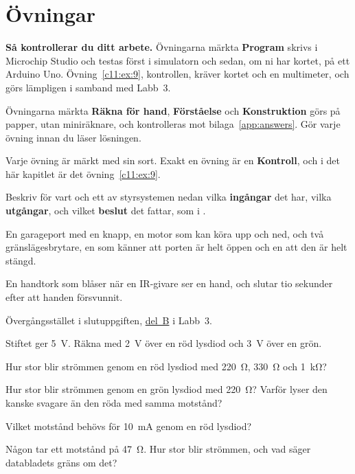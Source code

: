 
\section{Övningar}
\label{c11:sec:exercises}\label{c11:app:c}

\begin{aside}
\textbf{Så kontrollerar du ditt arbete.} Övningarna märkta \textbf{Program} skrivs i Microchip
Studio och testas först i simulatorn och sedan, om ni har kortet, på ett Arduino Uno.
Övning~\ref{c11:ex:9}, kontrollen, kräver kortet och en multimeter, och görs lämpligen i samband
med Labb~3.

Övningarna märkta \textbf{Räkna för hand}, \textbf{Förståelse} och \textbf{Konstruktion} görs på
papper, utan miniräknare, och kontrolleras mot bilaga~\ref{app:answers}. Gör varje övning innan du
läser lösningen.

Varje övning är märkt med sin sort. Exakt en övning är en \textbf{Kontroll}, och i det här kapitlet
är det övning~\ref{c11:ex:9}.
\end{aside}

\label{c11:ex:1}
Beskriv för vart och ett av styrsystemen nedan vilka \textbf{ingångar} det har, vilka
\textbf{utgångar}, och vilket \textbf{beslut} det fattar, som i .
\begin{parts}
  \item En garageport med en knapp, en motor som kan köra upp och ned, och två
    gränslägesbrytare, en som känner att porten är helt öppen och en att den är helt stängd.
  \item En handtork som blåser när en IR-givare ser en hand, och slutar tio sekunder efter att
    handen försvunnit.
  \item Övergångsstället i slutuppgiften, \hyperref[lab3:b]{del~B} i Labb~3.
\end{parts}

\label{c11:ex:2}
Stiftet ger 5~V. Räkna med 2~V över en röd lysdiod och 3~V över en grön.
\begin{parts}
  \item Hur stor blir strömmen genom en röd lysdiod med 220~Ω, 330~Ω och 1~kΩ?
  \item Hur stor blir strömmen genom en grön lysdiod med 220~Ω? Varför lyser den kanske svagare än
    den röda med samma motstånd?
  \item Vilket motstånd behövs för 10~mA genom en röd lysdiod?
  \item Någon tar ett motstånd på 47~Ω. Hur stor blir strömmen, och vad säger databladets gräns om
    det?
\end{parts}

